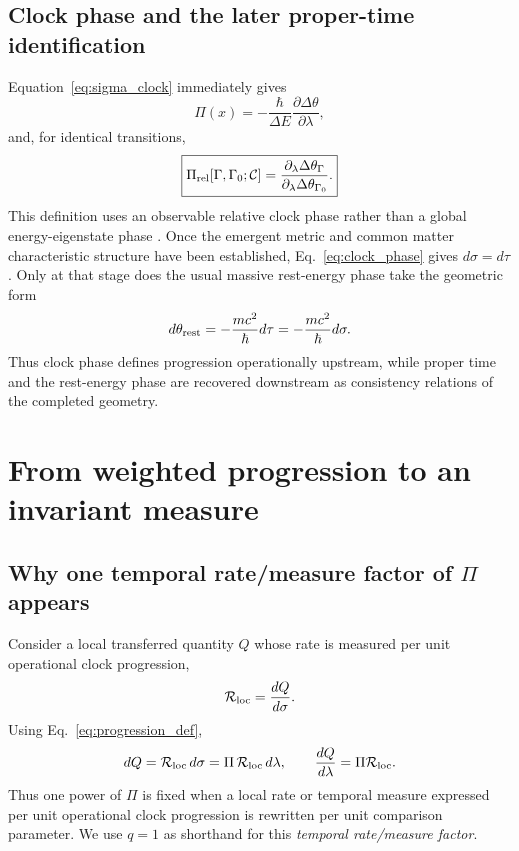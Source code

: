 \documentclass[11pt]{article}
\begin{document}
\subsection{Clock phase and the later proper-time identification}

Equation~\eqref{eq:sigma_clock} immediately gives
\begin{equation}
    \Pi(x)=-\frac{\hbar}{\Delta E}\frac{\partial\Delta\theta}{\partial\lambda},
    \label{eq:pi_phase}
\end{equation}
and, for identical transitions,
\begin{equation}
    \boxed{
    \Pi_{\rm rel}[\Gamma,\Gamma_0;\mathcal C]
    =\frac{\partial_\lambda\Delta\theta_\Gamma}
           {\partial_\lambda\Delta\theta_{\Gamma_0}}.}
    \label{eq:pi_rel_phase}
\end{equation}
This definition uses an observable relative clock phase rather than a global energy-eigenstate phase \cite{Zych2011,Roura2020,Roura2021}. Once the emergent metric and common matter characteristic structure have been established, Eq.~\eqref{eq:clock_phase} gives $d\sigma=d\tau$. Only at that stage does the usual massive rest-energy phase take the geometric form
\begin{equation}
    d\theta_{\rm rest}=-\frac{mc^2}{\hbar}d\tau
    =-\frac{mc^2}{\hbar}d\sigma.
    \label{eq:rest_phase}
\end{equation}
Thus clock phase defines progression operationally upstream, while proper time and the rest-energy phase are recovered downstream as consistency relations of the completed geometry.

\section{From weighted progression to an invariant measure}

\subsection{Why one temporal rate/measure factor of \texorpdfstring{$\Pi$}{Pi} appears}

Consider a local transferred quantity $Q$ whose rate is measured per unit operational clock progression,
\begin{equation}
    \mathcal R_{\rm loc}=\frac{dQ}{d\sigma}.
\end{equation}
Using Eq.~\eqref{eq:progression_def},
\begin{equation}
    dQ
    =\mathcal R_{\rm loc}\,d\sigma
    =\Pi\,\mathcal R_{\rm loc}\,d\lambda,
    \qquad
    \frac{dQ}{d\lambda}=\Pi\mathcal R_{\rm loc}.
    \label{eq:rate_conversion}
\end{equation}
Thus one power of $\Pi$ is fixed when a local rate or temporal measure expressed per unit operational clock progression is rewritten per unit comparison parameter. We use $q=1$ as shorthand for this \emph{temporal rate/measure factor}.
\end{document}
